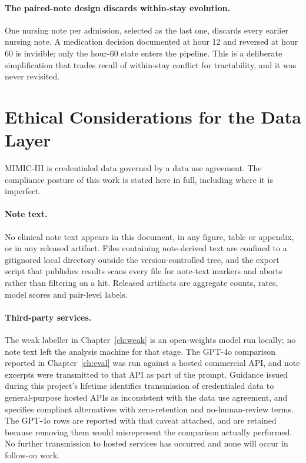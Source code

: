 \paragraph{The paired-note design discards within-stay evolution.} One nursing
note per admission, selected as the last one, discards every earlier nursing
note. A medication decision documented at hour 12 and reversed at hour 60 is
invisible; only the hour-60 state enters the pipeline. This is a deliberate
simplification that trades recall of within-stay conflict for tractability, and
it was never revisited.

\section{Ethical Considerations for the Data Layer}
\label{sec:data-ethics}

MIMIC-III is credentialed data governed by a data use agreement. The compliance
posture of this work is stated here in full, including where it is imperfect.

\paragraph{Note text.} No clinical note text appears in this document, in any
figure, table or appendix, or in any released artifact. Files containing
note-derived text are confined to a gitignored local directory outside the
version-controlled tree, and the export script that publishes results scans every
file for note-text markers and aborts rather than filtering on a hit. Released
artifacts are aggregate counts, rates, model scores and pair-level labels.

\paragraph{Third-party services.} The weak labeller in Chapter~\ref{ch:weak} is
an open-weights model run locally; no note text left the analysis machine for
that stage. The GPT-4o comparison reported in Chapter~\ref{ch:eval} was run
against a hosted commercial API, and note excerpts were transmitted to that API
as part of the prompt. Guidance issued during this project's lifetime identifies
transmission of credentialed data to general-purpose hosted APIs as inconsistent
with the data use agreement, and specifies compliant alternatives with
zero-retention and no-human-review terms. The GPT-4o rows are reported with that
caveat attached, and are retained because removing them would misrepresent the
comparison actually performed. No further transmission to hosted services has
occurred and none will occur in follow-on work.

